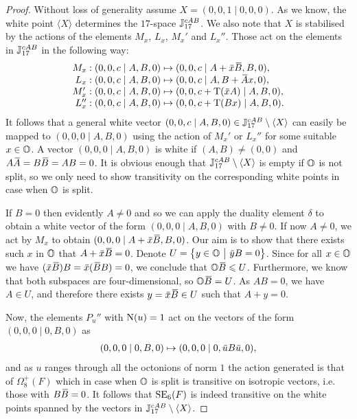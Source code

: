 \begin{proof}
	Without loss of generality assume $X = (0,0,1\mid 0,0,0)$. As we know, the white 
	point $\langle X \rangle$ determines the $17$-space $\mathbb{J}_{17}^{cAB}$. We also note that
	$X$ is stabilised by the actions of the elements $M_x$, $L_x$, $M_x'$ and $L_x''$. Those
	act on the elements in $\mathbb{J}_{17}^{cAB}$ in the following way:
	\begin{equation*}
		\begin{array}{r@{\;}c@{\;}l}
			M_x : (0,0,c\mid A,B,0) & \mapsto & (0,0,c\mid A+\ovx \ovB,B,0), \\
			L_x : (0,0,c\mid A,B,0) & \mapsto & (0,0,c\mid A,B+\ovA x,0), \\
			M_x' : (0,0,c\mid A,B,0) & \mapsto & (0,0,c+\Tr(\ovx A) \mid A,B,0), \\
			L_x'' : (0,0,c\mid A,B,0) & \mapsto & (0,0,c+\Tr(B x) \mid A,B,0).
		\end{array}
	\end{equation*}
	It follows that a general white vector $(0,0,c\mid A,B,0) \in \mathbb{J}_{17}^{cAB}\setminus
	 \langle X
	\rangle$ can easily be mapped to $(0,0,0\mid A,B,0)$ using the action of $M_x'$ or 
	$L_x''$ for some suitable $x \in \mathbb{O}$. A vector $(0,0,0\mid A,B,0)$ is white if
	$(A,B) \neq (0,0)$ and $A\ovA = B\ovB = AB = 0$. It is obvious enough that 
	$\mathbb{J}_{17}^{cAB} \setminus \langle X \rangle$ is empty if $\mathbb{O}$ is not split,
	so we only need to show transitivity on the corresponding white points in case
	when $\mathbb{O}$ is split.
	
	If $B = 0$ then evidently $A \neq 0$ and so we can apply the duality element $\delta$
	to obtain a white vector of the form $(0,0,0\mid A,B,0)$ with $B \neq 0$. 
	If now $A \neq 0$, we act by $M_x$ to obtain $(0,0,0\mid A+\ovx \ovB,B,0)$. Our 
	aim is to show that there exists such $x$ in $\mathbb{O}$ that $A+\ovx \ovB = 0$. 
	Denote $U = \left\{ y \in \mathbb{O}\ \big|\ \mathord{\mbox{\hspace*{0pt}}\,\overline{\!y\!\!\;}\!\:}\mbox{\hspace*{0pt}} B = 0\right\}$. Since for all
	$x \in \mathbb{O}$ we have \mbox{$(\ovx \ovB) B = \ovx (\ovB B) = 0$}, we conclude
	that $\mathbb{O} \mathord{\mbox{\hspace*{0pt}}\,\overline{\!B\!\!\;}\!\:}\mbox{\hspace*{0pt}} \leqslant U$. Furthermore, we know that both
	subspaces are four-dimensional, so $\mathbb{O}\mathord{\mbox{\hspace*{0pt}}\,\overline{\!B\!\!\;}\!\:}\mbox{\hspace*{0pt}} = U$. As $AB = 0$, we have $A \in U$, and
	therefore there exists $y = \ovx\ovB \in U$ such that $A+y = 0$.
	
	Now, the elements $P_u''$ with $\mathord{\mathrm{N}}(u)=1$ act on the vectors of the form 
	\mbox{$(0,0,0\mid 0,B,0)$} as
	\begin{equation*}
		\begin{array}{r@{\;}c@{\;}l}
			(0,0,0\mid 0,B,0) & \mapsto & (0,0,0\mid 0,\ovu B \ovu,0),
		\end{array}
	\end{equation*}
	and as $u$ ranges through all the octonions of norm $1$ the action generated is that
	of $\Omega_8^+(F)$ which in case when $\mathbb{O}$ is split is transitive on isotropic vectors,
	 i.e. those with $B\mathord{\mbox{\hspace*{0pt}}\,\overline{\!B\!\!\;}\!\:}\mbox{\hspace*{0pt}} = 0$.
	 It follows that $\mathrm{SE}_6(F)$ is indeed transitive on the white
	 points spanned by the vectors in $\mathbb{J}_{17}^{cAB} \setminus \langle X \rangle$.
	 

\end{proof}
